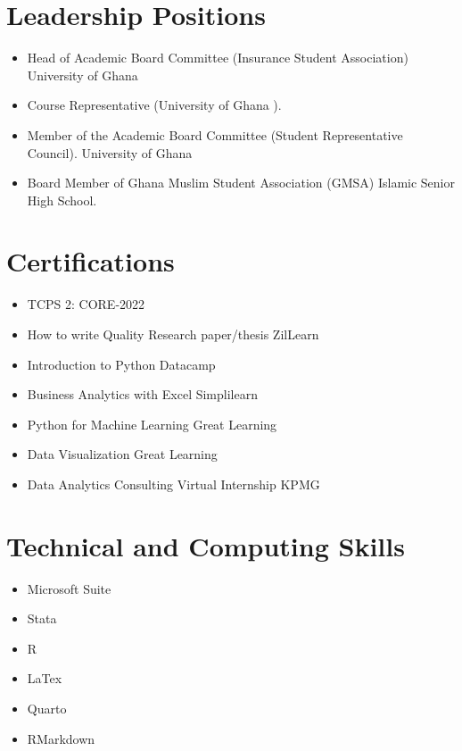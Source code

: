 \documentclass[
  letterpaper,
  DIV=11,
  numbers=noendperiod]{scrartcl}
\providecommand{\tightlist}{%
  \setlength{\itemsep}{0pt}\setlength{\parskip}{0pt}}\usepackage{longtable,booktabs,array}
\begin{document}
\hypertarget{leadership-positions}{%
\section{Leadership Positions}\label{leadership-positions}}

\begin{itemize}
\item
  Head of Academic Board Committee (Insurance Student Association)
  University of Ghana
\item
  Course Representative (University of Ghana ).
\item
  Member of the Academic Board Committee (Student Representative
  Council). University of Ghana
\item
  Board Member of Ghana Muslim Student Association (GMSA) Islamic Senior
  High School.
\end{itemize}

\hypertarget{certifications}{%
\section{Certifications}\label{certifications}}

\begin{itemize}
\item
  TCPS 2: CORE-2022
\item
  How to write Quality Research paper/thesis ZilLearn
\item
  Introduction to Python Datacamp
\item
  Business Analytics with Excel Simplilearn
\item
  Python for Machine Learning Great Learning
\item
  Data Visualization Great Learning
\item
  Data Analytics Consulting Virtual Internship KPMG
\end{itemize}

\hypertarget{technical-and-computing-skills}{%
\section{Technical and Computing
Skills}\label{technical-and-computing-skills}}

\begin{itemize}
\tightlist
\item
  Microsoft Suite
\item
  Stata
\item
  R
\item
  LaTex
\item
  Quarto
\item
  RMarkdown
\end{itemize}
\end{document}
